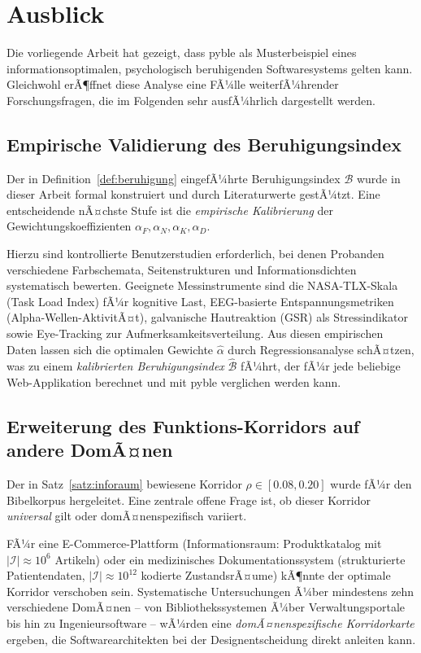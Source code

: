 ﻿\documentclass[a4paper,12pt]{article}
\theoremstyle{definition}
\begin{document}
\section{Ausblick}
\label{sec:ausblick}

Die vorliegende Arbeit hat gezeigt, dass pyble als Musterbeispiel eines
informationsoptimalen, psychologisch beruhigenden Softwaresystems gelten kann.
Gleichwohl erÃ¶ffnet diese Analyse eine FÃ¼lle weiterfÃ¼hrender Forschungsfragen,
die im Folgenden sehr ausfÃ¼hrlich dargestellt werden.

\subsection{Empirische Validierung des Beruhigungsindex}

Der in Definition~\ref{def:beruhigung} eingefÃ¼hrte Beruhigungsindex $\mathcal{B}$
wurde in dieser Arbeit formal konstruiert und durch Literaturwerte gestÃ¼tzt.
Eine entscheidende nÃ¤chste Stufe ist die \emph{empirische Kalibrierung} der
Gewichtungskoeffizienten $\alpha_F, \alpha_N, \alpha_K, \alpha_D$.

Hierzu sind kontrollierte Benutzerstudien erforderlich, bei denen Probanden
verschiedene Farbschemata, Seitenstrukturen und Informationsdichten systematisch
bewerten. Geeignete Messinstrumente sind die NASA-TLX-Skala (Task Load Index)
fÃ¼r kognitive Last, EEG-basierte Entspannungsmetriken (Alpha-Wellen-AktivitÃ¤t),
galvanische Hautreaktion (GSR) als Stressindikator sowie Eye-Tracking zur
Aufmerksamkeitsverteilung. Aus diesen empirischen Daten lassen sich die optimalen
Gewichte $\hat{\alpha}$ durch Regressionsanalyse schÃ¤tzen, was zu einem
\emph{kalibrierten Beruhigungsindex} $\hat{\mathcal{B}}$ fÃ¼hrt, der fÃ¼r jede
beliebige Web-Applikation berechnet und mit pyble verglichen werden kann.

\subsection{Erweiterung des Funktions-Korridors auf andere DomÃ¤nen}

Der in Satz~\ref{satz:inforaum} bewiesene Korridor $\rho \in [0.08, 0.20]$
wurde fÃ¼r den Bibelkorpus hergeleitet. Eine zentrale offene Frage ist,
ob dieser Korridor \emph{universal} gilt oder domÃ¤nenspezifisch variiert.

FÃ¼r eine E-Commerce-Plattform (Informationsraum: Produktkatalog mit
$|\mathcal{I}| \approx 10^6$ Artikeln) oder ein medizinisches
Dokumentationssystem (strukturierte Patientendaten, $|\mathcal{I}| \approx 10^{12}$
kodierte ZustandsrÃ¤ume) kÃ¶nnte der optimale Korridor verschoben sein.
Systematische Untersuchungen Ã¼ber mindestens zehn verschiedene DomÃ¤nen
-- von Bibliothekssystemen Ã¼ber Verwaltungsportale bis hin zu
Ingenieursoftware -- wÃ¼rden eine \emph{domÃ¤nenspezifische Korridorkarte}
ergeben, die Softwarearchitekten bei der Designentscheidung direkt
anleiten kann.
\end{document}
